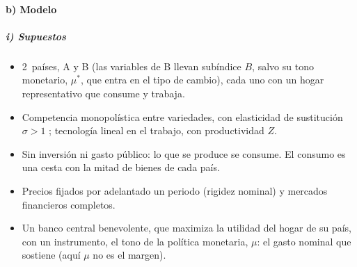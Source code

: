 \documentclass[11pt]{article}
\begin{document}
\paragraph{b) Modelo}
\subparagraph{i) Supuestos}
\begin{itemize}
\item 2~países, A y B (las variables de B llevan subíndice $B$, salvo su tono monetario, $\mu^*$, que entra en el tipo de cambio), cada uno con un hogar representativo que consume y trabaja.
\item Competencia monopolística entre variedades, con elasticidad de sustitución $\sigma>1$\nocite{DixitStiglitz1977Monopolistic} ; tecnología lineal en el trabajo, con productividad $Z$.
\item Sin inversión ni gasto público: lo que se produce se consume. El consumo es una cesta con la mitad de bienes de cada país.
\item Precios fijados por adelantado un periodo (rigidez nominal) y mercados financieros completos.
\item Un banco central benevolente, que maximiza la utilidad del hogar de su país, con un instrumento, el tono de la política monetaria, $\mu$: el gasto nominal que sostiene (aquí $\mu$ no es el margen).
\end{itemize}
\end{document}
